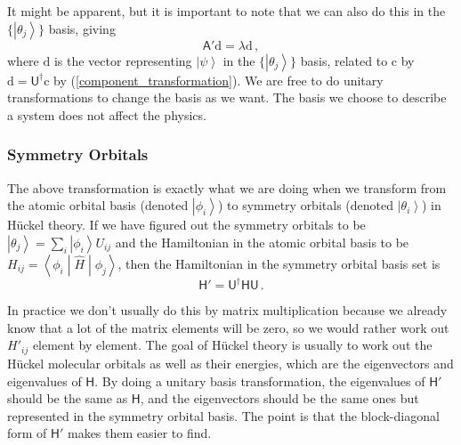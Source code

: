 \documentclass{article}
\theoremstyle{plain}\theoremheaderfont{\normalfont\itshape}\theorembodyfont{\rmfamily}\theoremseparator{.}\newtheorem*{rem}{Remark}\newtheorem*{ex}{Example}\newtheorem*{proof}{Proof}\newtheorem*{altp}{Alternative proof}
\theoremstyle{plain}\theoremheaderfont{\normalfont\bfseries}\theorembodyfont{\rmfamily}\theoremseparator{.}\newtheorem{thm}{Theorem}[section]\newtheorem{lem}[thm]{Lemma}\newtheorem{prop}[thm]{Proposition}\newtheorem*{cor}{Corollary}\newtheorem{defn}[thm]{Definition}\newtheorem{clm}[thm]{Claim}\newtheorem{clminproof}{Claim}
\theoremstyle{break}\theoremheaderfont{\normalfont\itshape}\theorembodyfont{\rmfamily}\theoremseparator{.\medskip}\newtheorem*{proofskip}{Proof}\newtheorem*{exs}{Examples}\newtheorem*{rems}{Remarks}
\theoremstyle{break}\theoremheaderfont{\normalfont\bfseries}\theorembodyfont{\rmfamily}\theoremseparator{.\medskip}\newtheorem{lemskip}[thm]{Lemma}\newtheorem{defnskip}[thm]{Definition}\newtheorem{propskip}[thm]{Proposition}\newtheorem{thmskip}[thm]{Theorem}
\numberwithin{equation}{section}
\newcommand{\ket}[1]{\left| #1 \right\rangle}
\newcommand{\mel}[3]{\left\langle #1 \middle| #2 \middle| #3 \right\rangle}
\newcommand{\vb}[1]{\bm{\mathrm{#1}}}
\begin{document}
    It might be apparent, but it is important to note that we can also do this in the \(\{\ket{\theta_j}\}\) basis, giving
    \begin{equation}
        \mathsf{A}'\vb{d}=\lambda\vb{d}\,,
    \end{equation}
    where \(\vb{d}\) is the vector representing \(\ket{\psi}\) in the \(\{\ket{\theta_j}\}\) basis, related to \(\vb{c}\) by \(\vb{d}=\mathsf{U}^\dagger\vb{c}\) by (\ref{component_transformation}). We are free to do unitary transformations to change the basis as we want. The basis we choose to describe a system does not affect the physics.

    \subsubsection{Symmetry Orbitals}
    The above transformation is exactly what we are doing when we transform from the atomic orbital basis (denoted \(\ket{\phi_i}\)) to symmetry orbitals (denoted \(\ket{\theta_i}\)) in H\"{u}ckel theory. If we have figured out the symmetry orbitals to be \(\ket{\theta_j}=\sum_{i}\ket{\phi_i}U_{ij}\) and the Hamiltonian in the atomic orbital basis to be \(H_{ij}=\mel{\phi_i}{\hat{H}}{\phi_j}\), then the Hamiltonian in the symmetry orbital basis set is
    \begin{equation}
        \mathsf{H}'=\mathsf{U}^\dagger\mathsf{HU}\,.
    \end{equation}

    In practice we don't usually do this by matrix multiplication because we already know that a lot of the matrix elements will be zero, so we would rather work out \(H'_{ij}\) element by element. The goal of H\"{u}ckel theory is usually to work out the H\"{u}ckel molecular orbitals as well as their energies, which are the eigenvectors and eigenvalues of \(\mathsf{H}\). By doing a unitary basis transformation, the eigenvalues of \(\mathsf{H}'\) should be the same as \(\mathsf{H}\), and the eigenvectors should be the same ones but represented in the symmetry orbital basis. The point is that the block-diagonal form of \(\mathsf{H}'\) makes them easier to find.
\end{document}

